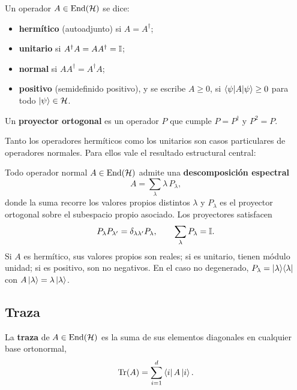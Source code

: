 \documentclass[../main.tex]{subfiles}
\begin{document}
\begin{definicion}
Un operador $A\in\operatorname{End}(\mathcal{H})$ se dice:
\begin{itemize}
    \item \textbf{hermítico} (autoadjunto) si $A=A^\dagger$;
    \item \textbf{unitario} si $A^\dagger A=AA^\dagger=\mathbb{I}$;
    \item \textbf{normal} si $AA^\dagger=A^\dagger A$;
    \item \textbf{positivo} (semidefinido positivo), y se escribe $A\ge 0$, si $\braket{\psi|A|\psi}\ge 0$ para todo $\ket{\psi}\in\mathcal{H}$.
\end{itemize}
Un \textbf{proyector ortogonal} es un operador $P$ que cumple $P=P^\dagger$ y $P^2=P$.
\end{definicion}

Tanto los operadores hermíticos como los unitarios son casos particulares de operadores normales. Para ellos vale el resultado estructural central:

\begin{teorema}
Todo operador normal $A\in\operatorname{End}(\mathcal{H})$ admite una \textbf{descomposición espectral}
\begin{equation*}
    A=\sum_{\lambda}\lambda\,P_\lambda,
\end{equation*}
donde la suma recorre los valores propios distintos $\lambda$ y $P_\lambda$ es el proyector ortogonal sobre el subespacio propio asociado. Los proyectores satisfacen
\begin{equation*}
    P_\lambda P_{\lambda'}=\delta_{\lambda\lambda'}P_\lambda,
    \qquad
    \sum_{\lambda}P_\lambda=\mathbb{I}.
\end{equation*}
Si $A$ es hermítico, sus valores propios son reales; si es unitario, tienen módulo unidad; si es positivo, son no negativos. En el caso no degenerado, $P_\lambda=\ket{\lambda}\!\bra{\lambda}$ con $A\ket{\lambda}=\lambda\ket{\lambda}$.
\end{teorema}

\subsection*{Traza}

\begin{definicion}[Traza]
La \textbf{traza} de $A\in\operatorname{End}(\mathcal{H})$ es la suma de sus elementos diagonales en cualquier base ortonormal,
\begin{equation*}
    \Tr(A)=\sum_{i=1}^{d}\bra{i}A\ket{i}.
\end{equation*}
\end{definicion}
\end{document}
